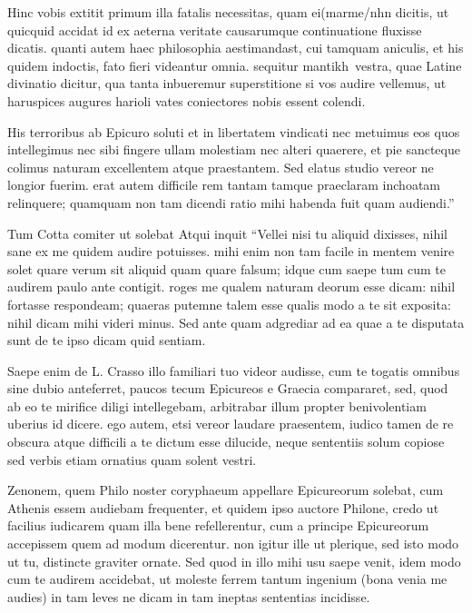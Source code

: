  Hinc vobis extitit primum illa fatalis necessitas, quam ei(marme/nhn dicitis, ut quicquid accidat id ex aeterna veritate causarumque continuatione fluxisse dicatis. quanti autem haec philosophia aestimandast, cui tamquam aniculis, et his quidem indoctis, fato fieri videantur omnia. sequitur mantikh\ vestra, quae Latine divinatio dicitur, qua tanta inbueremur superstitione si vos audire vellemus, ut haruspices augures harioli vates coniectores nobis essent colendi.

 His terroribus ab Epicuro soluti et in libertatem vindicati nec metuimus eos quos intellegimus nec sibi fingere ullam molestiam nec alteri quaerere, et pie sancteque colimus naturam excellentem atque praestantem. Sed elatus studio vereor ne longior fuerim. erat autem difficile rem tantam tamque praeclaram inchoatam relinquere; quamquam non tam dicendi ratio mihi habenda fuit quam audiendi.''

 Tum Cotta comiter ut solebat Atqui inquit ``Vellei nisi tu aliquid dixisses, nihil sane ex me quidem audire potuisses. mihi enim non tam facile in mentem venire solet quare verum sit aliquid quam quare falsum; idque cum saepe tum cum te audirem paulo ante contigit. roges me qualem naturam deorum esse dicam: nihil fortasse respondeam; quaeras putemne talem esse qualis modo a te sit exposita: nihil dicam mihi videri minus. Sed ante quam adgrediar ad ea quae a te disputata sunt de te ipso dicam quid sentiam.

 Saepe enim de L. Crasso illo familiari tuo videor audisse, cum te togatis omnibus sine dubio anteferret, paucos tecum Epicureos e Graecia compararet, sed, quod ab eo te mirifice diligi intellegebam, arbitrabar illum propter benivolentiam uberius id dicere. ego autem, etsi vereor laudare praesentem, iudico tamen de re obscura atque difficili a te dictum esse dilucide, neque sententiis solum copiose sed verbis etiam ornatius quam solent vestri.

 Zenonem, quem Philo noster coryphaeum appellare Epicureorum solebat, cum Athenis essem audiebam frequenter, et quidem ipso auctore Philone, credo ut facilius iudicarem quam illa bene refellerentur, cum a principe Epicureorum accepissem quem ad modum dicerentur. non igitur ille ut plerique, sed isto modo ut tu, distincte graviter ornate. Sed quod in illo mihi usu saepe venit, idem modo cum te audirem accidebat, ut moleste ferrem tantum ingenium (bona venia me audies) in tam leves ne dicam in tam ineptas sententias incidisse.

